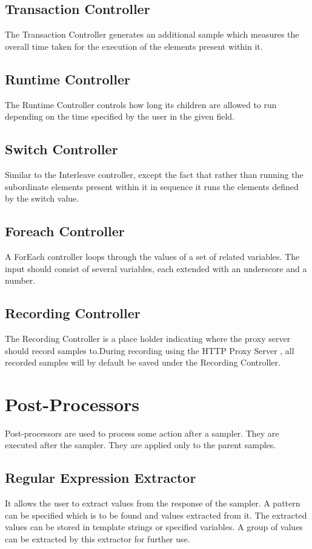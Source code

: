 \documentclass[12pt]{book}
\begin{document}
  \subsection{Transaction Controller}
  The Transaction Controller generates an additional sample which measures the overall time taken for the execution of the elements present within it.
  
  \subsection{Runtime Controller}
  The Runtime Controller controls how long its children are allowed to run depending on the time specified by the user in the given field. 
  
  \subsection{Switch Controller}
  Similar to the Interleave controller, except the fact that rather than running the subordinate elements present within it  in sequence it runs
  the elements defined by the switch value. 
  
  \subsection{Foreach Controller}
  A ForEach controller loops through the values of a set of related variables. 
  The input should consist of several variables, each extended with an underscore and a number.  
  
  \subsection{Recording Controller}
  The Recording Controller is a place holder indicating where the proxy server should record samples to.During recording using the HTTP Proxy Server \cite{Ehh},
  all recorded samples will by default be saved under the Recording Controller. 

\section{Post-Processors}
Post-processors are used to process some action after a sampler. They are executed after the sampler. They are applied only to the parent
samples.\cite{Ehh} \cite{Jmeter}\cite{Manual}

  \subsection{Regular Expression Extractor}
  It allows the user to extract values from the response of the sampler. A pattern can be specified which is to be found and values extracted from it.
  The extracted values can be stored in template strings or specified variables. A group of values can be extracted by this extractor for further use.
  
\end{document}
